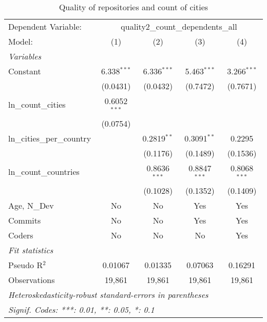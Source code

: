 \begin{table}[htbp]
   \caption{Quality of repositories and count of cities}
   \centering
   \begin{tabular}{lcccc}
      \tabularnewline \midrule \midrule
      Dependent Variable: & \multicolumn{4}{c}{quality2\_count\_dependents\_all}\\
      Model:                      & (1)            & (2)            & (3)            & (4)\\  
      \midrule
      \emph{Variables}\\
      Constant                    & 6.338$^{***}$  & 6.336$^{***}$  & 5.463$^{***}$  & 3.266$^{***}$\\   
                                  & (0.0431)       & (0.0432)       & (0.7472)       & (0.7671)\\   
      ln\_count\_cities           & 0.6052$^{***}$ &                &                &   \\   
                                  & (0.0754)       &                &                &   \\   
      ln\_cities\_per\_country    &                & 0.2819$^{**}$  & 0.3091$^{**}$  & 0.2295\\   
                                  &                & (0.1176)       & (0.1489)       & (0.1536)\\   
      ln\_count\_countries        &                & 0.8636$^{***}$ & 0.8847$^{***}$ & 0.8068$^{***}$\\   
                                  &                & (0.1028)       & (0.1352)       & (0.1409)\\   
      Age, N\_Dev                 & No             & No             & Yes            & Yes\\  
      Commits                     & No             & No             & Yes            & Yes\\  
      Coders                      & No             & No             & No             & Yes\\  
      \midrule
      \emph{Fit statistics}\\
      Pseudo R$^2$                & 0.01067        & 0.01335        & 0.07063        & 0.16291\\  
      Observations                & 19,861         & 19,861         & 19,861         & 19,861\\  
      \midrule \midrule
      \multicolumn{5}{l}{\emph{Heteroskedasticity-robust standard-errors in parentheses}}\\
      \multicolumn{5}{l}{\emph{Signif. Codes: ***: 0.01, **: 0.05, *: 0.1}}\\
   \end{tabular}
\end{table}



